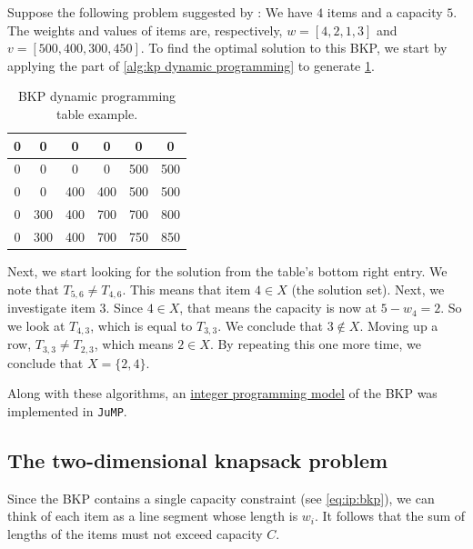 \begin{example}
    Suppose the following problem suggested by \textcite{FEOFILOFF2020a}: We have $4$ items and a capacity $5$. The weights and values of items are, respectively, $w = [4, 2, 1, 3]$ and $v = [500, 400, 300, 450]$. To find the optimal solution to this BKP, we start by applying the part of \cref{alg:kp dynamic programming} to generate \cref{tab:kp dynamic programming table}.

    \begin{table}[h]
        \centering
        \caption{BKP dynamic programming table example.}
        \label{tab:kp dynamic programming table}
        \begin{tabular}{|c c c c c c|}
            \hline
            0 & 0 & 0 & 0 & 0 & 0\\
            \hline
            0 & 0 & 0 & 0 & 500 & 500\\
            \hline
            0 & 0 & 400 & 400 & 500 & 500\\
            \hline
            0 & 300 & 400 & 700 & 700 & 800\\
            \hline
            0 & 300 & 400 & 700 & 750 & 850\\
            \hline
        \end{tabular}
    \end{table}

    Next, we start looking for the solution from the table's bottom right entry. We note that $T_{5,6} \neq T_{4,6}$. This means that item $4 \in X$ (the solution set). Next, we investigate item $3$. Since $4 \in X$, that means the capacity is now at $5 - w_4 = 2$. So we look at $T_{4,3}$, which is equal to $T_{3,3}$. We conclude that $3 \notin X$. Moving up a row, $T_{3,3} \neq T_{2,3}$, which means $2 \in X$. By repeating this one more time, we conclude that $X = \{2,4\}$.
\end{example}

Along with these algorithms, an \href{https://github.com/phcentenaro7/IC-Knapsack/blob/main/Knapsack/Misc/1DKP.jl}{integer programming model} of the BKP was implemented in \texttt{JuMP}.

\subsection{The two-dimensional knapsack problem}

Since the BKP contains a single capacity constraint (see \cref{eq:ip:bkp}), we can think of each item as a line segment whose length is $w_i$. It follows that the sum of lengths of the items must not exceed capacity $C$.

